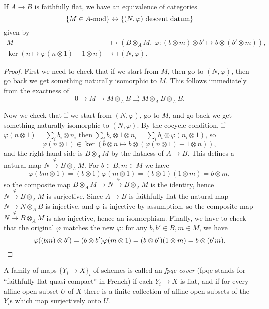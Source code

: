 \begin{thm} If $A \rightarrow B$ is faithfully flat, we have an equivalence of categories
\[
\{M \in A\mbox{\rm -mod}\} \leftrightarrow \{(N,\varphi) \mbox{\rm{ descent datum}}\}
\]
given by
\begin{align*}
M &\mapsto (B\otimes_A M,\ \varphi:(b\otimes m)\otimes b' \mapsto b\otimes (b'\otimes m)),\\
\ker(n\mapsto \varphi(n\otimes 1)-1\otimes n) &\mapsfrom (N,\varphi).
\end{align*}
\end{thm}
\begin{proof} First we need to check that if we start from $M$, then go to $(N,\varphi)$, then go back we get something naturally isomorphic to $M$. This follows immediately from the exactness of
\[
0 \rightarrow M \rightarrow M\otimes_AB \rightrightarrows M\otimes_AB\otimes_AB.
\]

Now we check that if we start from $(N,\varphi)$, go to $M$, and go back we get something naturally isomorphic to $(N,\varphi)$. By the cocycle condition, if $\varphi(n\otimes 1) = \sum_i b_i\otimes n_i$ then $\sum_i b_i\otimes 1\otimes n_i = \sum_i b_i\otimes \varphi(n_i\otimes 1)$, so
\[
\varphi(n\otimes 1) \in \ker(b\otimes n \mapsto b\otimes (\varphi(n\otimes 1)-1\otimes n)),
\]
and the right hand side is $B\otimes_A M$ by the flatness of $A\rightarrow B$. This defines a natural map $N \stackrel{\varphi}{\rightarrow} B\otimes_AM$. For $b \in B, m \in M$ we have
\[
\varphi(bm\otimes 1) = (b\otimes 1)\varphi(m\otimes 1) = (b\otimes 1)(1\otimes m) = b\otimes m,
\]
so the composite map $B\otimes_A M \rightarrow N \stackrel{\varphi}{\rightarrow} B\otimes_AM$ is the identity, hence $N\stackrel{\varphi}{\rightarrow} B\otimes_AM$ is surjective. Since $A\rightarrow B$ is faithfully flat the natural map $N \rightarrow N\otimes_AB$ is injective, and $\varphi$ is injective by assumption, so the composite map $N\stackrel{\varphi}{\rightarrow} B\otimes_AM$ is also injective, hence an isomorphism. Finally, we have to check that the original $\varphi$ matches the new $\varphi$: for any $b,b'\in B, m \in M$, we have
\[
\varphi((bm)\otimes b') = (b\otimes b')\varphi(m\otimes 1) = (b\otimes b')(1\otimes m) = b\otimes (b'm).\qedhere
\]
\end{proof}

\begin{defn} A family of maps $\{Y_i \rightarrow X\}_i$ of schemes is called an \emph{fpqc cover} (fpqc stands for ``faithfully flat quasi-compact'' in French) if each $Y_i \rightarrow X$ is flat, and if for every affine open subset $U$ of $X$ there is a finite collection of affine open subsets of the $Y_i$s which map surjectively onto $U$.
\end{defn}

